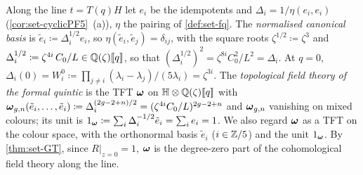 \begin{defn}
\label{def:set-frob}
Along the line $t=T(q)H$ let $e_i$ be the idempotents and $\Delta_i=1/\eta(e_i,e_i)$ (\cref{cor:set-cyclicPF5}~(a)), $\eta$ the pairing of \cref{def:set-fq}. The \emph{normalised canonical basis} is $\tilde e_i\coloneqq\Delta_i^{1/2}e_i$, so $\eta(\tilde e_i,\tilde e_j)=\delta_{ij}$, with the square roots $\zeta^{1/2}\coloneqq\zeta^3$ and $\Delta_i^{1/2}\coloneqq\zeta^{4i}\,C_0/L\in\mathbb{Q}(\zeta)[\![ q ]\!]$, so that $(\Delta_i^{1/2})^2=\zeta^{8i}C_0^2/L^2=\Delta_i$. At $q=0$, $\Delta_i(0)=W^0_i\coloneqq\prod_{j\neq i}(\lambda_i-\lambda_j)/(5\lambda_i)=\zeta^{3i}$. The \emph{topological field theory of the formal quintic} is the TFT $\boldsymbol{\omega}$ on $\mathbb{H}\otimes\mathbb{Q}(\zeta)[\![ q ]\!]$ with $\boldsymbol{\omega}_{g,n}(\tilde e_i,\dots,\tilde e_i)\coloneqq\Delta_i^{(2g-2+n)/2}=(\zeta^{4i}C_0/L)^{2g-2+n}$ and $\boldsymbol{\omega}_{g,n}$ vanishing on mixed colours; its unit is $1_{\boldsymbol{\omega}}\coloneqq\sum_i\Delta_i^{-1/2}\tilde e_i=\sum_ie_i=1$. We also regard $\boldsymbol{\omega}$ as a TFT on the colour space, with the orthonormal basis $\tilde e_i$ ($i\in\mathbb{Z}/5$) and the unit $1_{\boldsymbol{\omega}}$. By \cref{thm:set-GT}, since $R|_{z=0}=1$, $\boldsymbol{\omega}$ is the degree-zero part of the cohomological field theory along the line.
\end{defn}


